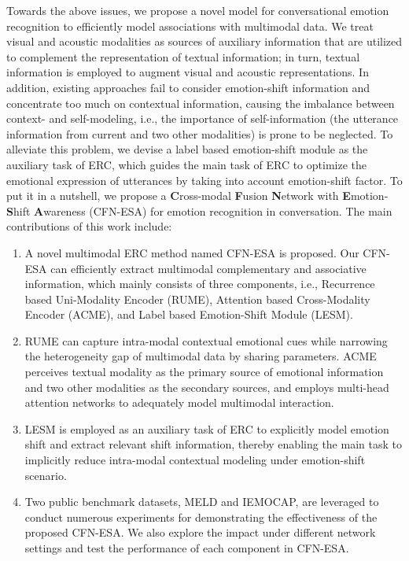 \documentclass[journal]{IEEEtran}
\begin{document}
Towards the above issues, we propose a novel model for conversational emotion recognition to efficiently model associations with multimodal data. We treat visual and acoustic modalities as sources of auxiliary information that are utilized to complement the representation of textual information; in turn, textual information is employed to augment visual and acoustic representations. In addition, existing approaches fail to consider emotion-shift information and concentrate too much on contextual information, causing the imbalance between context- and self-modeling, i.e., the importance of self-information (the utterance information from current and two other modalities) is prone to be neglected. To alleviate this problem, we devise a label based emotion-shift module as the auxiliary task of ERC, which guides the main task of ERC to optimize the emotional expression of utterances by taking into account emotion-shift factor. To put it in a nutshell, we propose a \textbf{C}ross-modal \textbf{F}usion \textbf{N}etwork with \textbf{E}motion-\textbf{S}hift \textbf{A}wareness (CFN-ESA) for emotion recognition in conversation. The main contributions of this work include:
\begin{enumerate}
	\item A novel multimodal ERC method named CFN-ESA is proposed. Our CFN-ESA can efficiently extract multimodal complementary and associative information, which mainly consists of three components, i.e., Recurrence based Uni-Modality Encoder (RUME), Attention based Cross-Modality Encoder (ACME), and Label based Emotion-Shift Module (LESM).
	\item RUME can capture intra-modal contextual emotional cues while narrowing the heterogeneity gap of multimodal data by sharing parameters. ACME perceives textual modality as the primary source of emotional information and two other modalities as the secondary sources, and employs multi-head attention networks to adequately model multimodal interaction. 
	\item LESM is employed as an auxiliary task of ERC to explicitly model emotion shift and extract relevant shift information, thereby enabling the main task to implicitly reduce intra-modal contextual modeling under emotion-shift scenario.
	\item Two public benchmark datasets, MELD and IEMOCAP, are leveraged to conduct numerous experiments for demonstrating the effectiveness of the proposed CFN-ESA. We also explore the impact under different network settings and test the performance of each component in CFN-ESA.
\end{enumerate}
\end{document}

